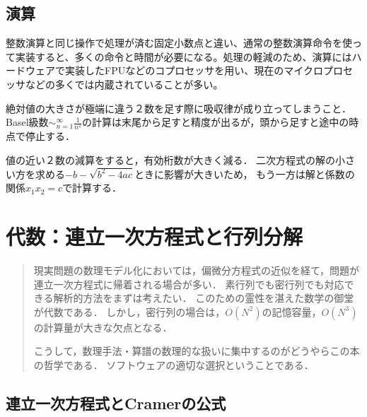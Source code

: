 \documentclass[uplatex, dvipdfmx]{jsreport}
\begin{document}
\section{演算}

\begin{tcolorbox}[colframe=ForestGreen, colback=ForestGreen!10!white,breakable,colbacktitle=ForestGreen!40!white,coltitle=black,fonttitle=\bfseries\sffamily,
title=遠すぎる数の和，近すぎる数の差には注意．]
    整数演算と同じ操作で処理が済む固定小数点と違い、通常の整数演算命令を使って実装すると、多くの命令と時間が必要になる。処理の軽減のため、演算にはハードウェアで実装したFPUなどのコプロセッサを用い、現在のマイクロプロセッサなどの多くでは内蔵されていることが多い。 
\end{tcolorbox}

\begin{example}
    絶対値の大きさが極端に違う２数を足す際に吸収律が成り立ってしまうこと．
    Basel級数$\sim^\infty_{n=1}\frac{1}{n^2}$の計算は末尾から足すと精度が出るが，頭から足すと途中の時点で停止する．
\end{example}

\begin{example}\label{exp-loss-of-significance-in-quadratic-formula}
    値の近い２数の減算をすると，有効桁数が大きく減る．
    二次方程式の解の小さい方を求める$-b-\sqrt{b^2-4ac}$ときに影響が大きいため，
    もう一方は解と係数の関係$x_1x_2=c$で計算する．
\end{example}

\chapter{代数：連立一次方程式と行列分解}

\begin{quotation}
    現実問題の数理モデル化においては，偏微分方程式の近似を経て，問題が連立一次方程式に帰着される場合が多い．
    素行列でも密行列でも対応できる解析的方法をまずは考えたい．
    このための霊性を湛えた数学の御堂が代数である．
    しかし，密行列の場合は，$O(N^2)$の記憶容量，$O(N^3)$の計算量が大きな欠点となる．

    こうして，数理手法・算譜の数理的な扱いに集中するのがどうやらこの本の哲学である．
    ソフトウェアの適切な選択ということである．
\end{quotation}

\section{連立一次方程式とCramerの公式}
\end{document}
